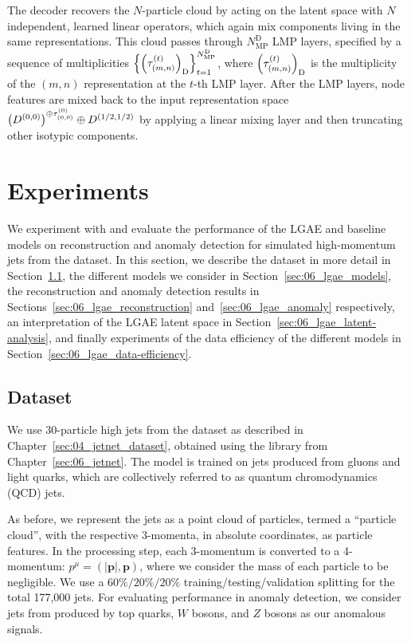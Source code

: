 The decoder recovers the $N$-particle cloud by acting on the latent space with $N$ independent, learned linear operators, which again mix components living in the same representations.
This cloud passes through $N_{\mathrm{MP}}^\mathrm{D}$ LMP layers, specified by a sequence of multiplicities $\left\{ \left( \tau_{(m, n)}^{(t)} \right)_\mathrm{D} \right\}_{t=1}^{N_{\mathrm{MP}}^\mathrm{D}}$, where $\left( \tau_{(m, n)}^{(t)} \right)_\mathrm{D}$ is the multiplicity of the $(m, n)$ representation at the $t$-th LMP layer.
After the LMP layers, node features are mixed back to the input representation space $\left( D^{(0,0)} \right)^{\oplus \tau_{(0,0)}^{(0)}} \oplus D^{(1/2, 1/2)}$ by applying a linear mixing layer and then truncating other isotypic components. 

\section{Experiments}
\label{sec:06_lgae_experiments}

We experiment with and evaluate the performance of the LGAE and baseline models on reconstruction and anomaly detection for simulated high-momentum jets from the \jetnet dataset.
In this section, we describe the dataset in more detail in Section~\ref{sec:06_lgae_dataset}, the different models we consider in Section~\ref{sec:06_lgae_models}, the reconstruction and anomaly detection results in Sections~\ref{sec:06_lgae_reconstruction} and~\ref{sec:06_lgae_anomaly} respectively, an interpretation of the LGAE latent space in Section~\ref{sec:06_lgae_latent-analysis}, and finally experiments of the data efficiency of the different models in Section~\ref{sec:06_lgae_data-efficiency}.

\subsection{Dataset}
\label{sec:06_lgae_dataset}

We use 30-particle high \pt jets from the \jetnet dataset as described in Chapter~\ref{sec:04_jetnet_dataset}, obtained using the \jetnet library from Chapter~\ref{sec:06_jetnet}.
The model is trained on jets produced from gluons and light quarks, which are collectively referred to as quantum chromodynamics (QCD) jets.

As before, we represent the jets as a point cloud of particles, termed a ``particle cloud'', with the respective 3-momenta, in absolute coordinates, as particle features.
In the processing step, each 3-momentum is converted to a 4-momentum: $p^\mu = (|\mathbf{p}|, \mathbf{p})$, where we consider the mass of each particle to be negligible.
We use a $60\%/20\%/20\%$ training/testing/validation splitting for the total 177,000 jets.
For evaluating performance in anomaly detection, we consider jets from \jetnet produced by top quarks, $W$ bosons, and $Z$ bosons as our anomalous signals.


